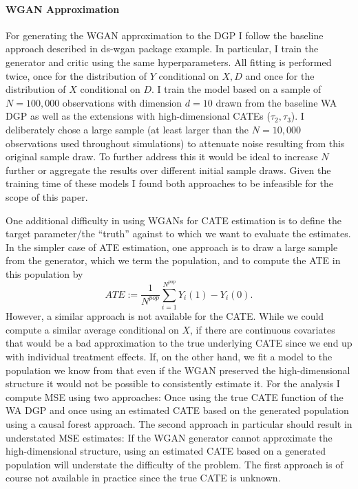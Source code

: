 \documentclass[11pt, a4paper, leqno]{article}
\begin{document}
\paragraph*{WGAN Approximation}
For generating the WGAN approximation to the DGP I follow the baseline approach described in ds-wgan package example.
In particular, I train the generator and critic using the same hyperparameters.
All fitting is performed twice, once for the distribution of $Y$ conditional on $X, D$ and once for the distribution of $X$ conditional on $D$.
I train the model based on a sample of $N=100,000$ observations with dimension $d=10$ drawn from the baseline WA DGP as well as the extensions with high-dimensional CATEs ($\tau_2, \tau_3$).
I deliberately chose a large sample (at least larger than the $N=10,000$ observations used throughout simulations) to attenuate noise resulting from this original sample draw.
To further address this it would be ideal to increase $N$ further or aggregate the results over different initial sample draws.
Given the training time of these models I found both approaches to be infeasible for the scope of this paper.

One additional difficulty in using WGANs for CATE estimation is to define the target parameter/the ``truth'' against to which we want to evaluate the estimates.
In the simpler case of ATE estimation, one approach is to draw a large sample from the generator, which we term the population, and to compute the ATE in this population by
\begin{equation*}
    ATE := \frac{1}{N^{pop}} \sum_{i=1}^{N^{pop}} Y_i(1) - Y_i(0).
\end{equation*}
However, a similar approach is not available for the CATE\@.
While we could compute a similar average conditional on $X$, if there are continuous covariates that would be a bad approximation to the true underlying CATE since we end up with individual treatment effects.
If, on the other hand, we fit a model to the population we know from that even if the WGAN preserved the high-dimensional structure it would not be possible to consistently estimate it.
For the analysis I compute MSE using two approaches: Once using the true CATE function of the WA DGP and once using an estimated CATE based on the generated population using a causal forest approach.
The second approach in particular should result in understated MSE estimates: If the WGAN generator cannot approximate the high-dimensional structure, using an estimated CATE based on a generated population will understate the difficulty of the problem.
The first approach is of course not available in practice since the true CATE is unknown.
\end{document}
